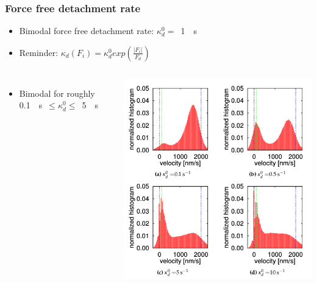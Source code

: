 \documentclass[11pt]{beamer}
\begin{document}
\begin{frame}
 \frametitle{Force free detachment rate}
 \begin{itemize}
  \item 
    Bimodal force free detachment rate: \mbox{$\kappa_d^0 = $ \SI{1}{\per\second}}
  \item
    Reminder: $\kappa_d\left(F_i\right) = \kappa_d^0 exp\left(\frac{\vert F_i\vert}{F_d}\right)$
 \end{itemize}
 
  \begin{columns}
    \begin{itemize}
     \item Bimodal for roughly \mbox{\SI{0.1}{\per\second} $\leq \kappa_d^0 \leq $ \SI{5}{\per\second}}
    \end{itemize}
    \includegraphics[scale=.37]{img/kd0.png}
 \end{columns} 
\end{frame}
\end{document}
